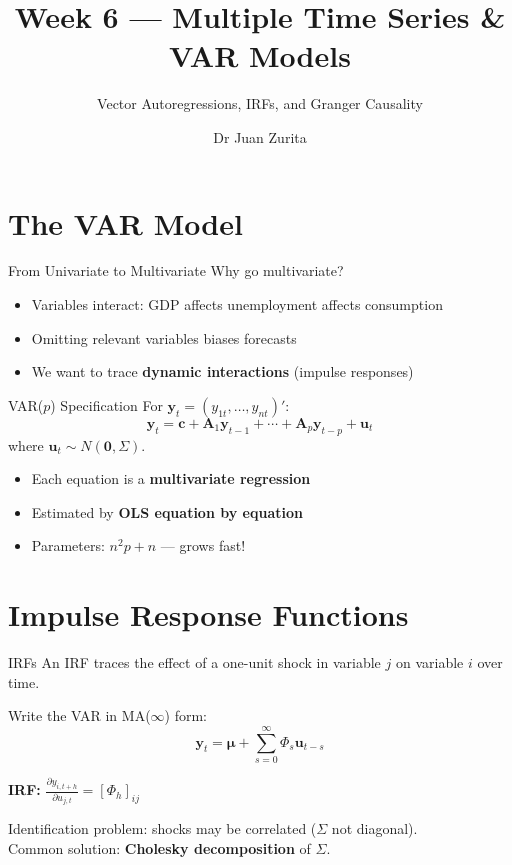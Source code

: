 \documentclass[aspectratio=169, 10pt]{beamer}
\title{Week 6 --- Multiple Time Series \& VAR Models}
\subtitle{Vector Autoregressions, IRFs, and Granger Causality}
\author{Dr Juan Zurita}
\institute{Economic \& Business Forecasting\\
The University of Edinburgh~$\cdot$~School of Economics}
\date{}
\begin{document}
\maketitle


\section{The VAR Model}

\begin{frame}{From Univariate to Multivariate}
Why go multivariate?
\begin{itemize}
    \item Variables \alert{interact}: GDP affects unemployment affects consumption
    \item Omitting relevant variables biases forecasts
    \item We want to trace \textbf{dynamic interactions} (impulse responses)
\end{itemize}
\end{frame}

\begin{frame}{VAR($p$) Specification}
For $\mathbf{y}_t = (y_{1t}, \ldots, y_{nt})'$:
\[
\mathbf{y}_t = \mathbf{c} + \mathbf{A}_1 \mathbf{y}_{t-1} + \cdots + \mathbf{A}_p \mathbf{y}_{t-p} + \mathbf{u}_t
\]
where $\mathbf{u}_t \sim N(\mathbf{0}, \Sigma)$.

\vspace{0.5em}
\begin{itemize}
    \item Each equation is a \textbf{multivariate regression}
    \item Estimated by \textbf{OLS equation by equation}
    \item Parameters: $n^2 p + n$ --- grows fast!
\end{itemize}
\end{frame}

\section{Impulse Response Functions}

\begin{frame}{IRFs}
An IRF traces the effect of a \alert{one-unit shock} in variable $j$ on variable $i$ over time.

\vspace{0.5em}
Write the VAR in MA($\infty$) form:
\[
\mathbf{y}_t = \boldsymbol{\mu} + \sum_{s=0}^{\infty} \Phi_s \mathbf{u}_{t-s}
\]

\textbf{IRF:} $\frac{\partial y_{i,t+h}}{\partial u_{j,t}} = [\Phi_h]_{ij}$

\vspace{0.5em}
\alert{Identification problem:} shocks may be correlated ($\Sigma$ not diagonal). \\
Common solution: \textbf{Cholesky decomposition} of $\Sigma$.
\end{frame}
\end{document}
